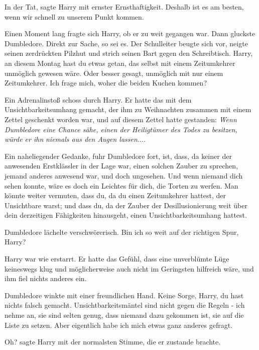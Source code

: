 \glqq{}In der Tat\grqq{}, sagte Harry mit ernster Ernsthaftigkeit. \glqq{}Deshalb
ist es am besten, wenn wir schnell zu unserem Punkt kommen.\grqq{}

Einen Moment lang fragte sich Harry, ob er zu weit gegangen war. Dann gluckste
Dumbledore. \glqq{}Direkt zur Sache, so sei es.\grqq{} Der Schulleiter beugte
sich vor, neigte seinen zerdrückten Pilzhut und strich seinen Bart gegen den
Schreibtisch. \glqq{}Harry, an diesem Montag hast du etwas getan, das selbst mit
einem Zeitumkehrer unmöglich gewesen wäre. Oder besser gesagt, unmöglich mit nur
einem Zeitumkehrer. Ich frage mich, woher die beiden Kuchen kommen?\grqq{}

Ein Adrenalinstoß schoss durch Harry. Er hatte das mit dem Unsichtbarkeitsumhang
gemacht, der ihm zu Weihnachten zusammen mit einem Zettel geschenkt worden war,
und auf diesem Zettel hatte gestanden: \emph{Wenn Dumbledore eine Chance sähe,
einen der Heiligtümer des Todes zu besitzen, würde er ihn} \emph{niemals aus den
Augen lassen.}...

\glqq{}Ein naheliegender Gedanke\grqq{}, fuhr Dumbledore fort, \glqq{}ist, dass,
da keiner der anwesenden Erstklässler in der Lage war, einen solchen Zauber zu
sprechen, jemand anderes anwesend war, und doch ungesehen. Und wenn niemand dich
sehen konnte, wäre es doch ein Leichtes für dich, die Torten zu werfen. Man
könnte weiter vermuten, dass du, da du einen Zeitumkehrer hattest, der
Unsichtbare warst; und dass du, da der Zauber der Desillusionierung weit über
dein derzeitigen Fähigkeiten hinausgeht, einen Unsichtbarkeitsumhang
hattest.\grqq{}

Dumbledore lächelte verschwörerisch. \glqq{}Bin ich so weit auf der richtigen
Spur, Harry?\grqq{}

Harry war wie erstarrt. Er hatte das Gefühl, dass eine unverblümte Lüge
keineswegs klug und möglicherweise auch nicht im Geringsten hilfreich wäre, und
ihm fiel nichts anderes ein.

Dumbledore winkte mit einer freundlichen Hand. \glqq{}Keine Sorge, Harry, du hast
nichts falsch gemacht. Unsichtbarkeitsmäntel sind nicht gegen die Regeln - ich
nehme an, sie sind selten genug, dass niemand dazu gekommen ist, sie auf die
Liste zu setzen. Aber eigentlich habe ich mich etwas ganz anderes
gefragt.\grqq{}

\glqq{}Oh?\grqq{} sagte Harry mit der normalsten Stimme, die er zustande brachte.

